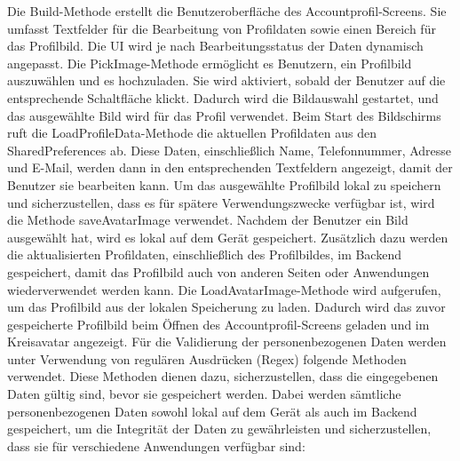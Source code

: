 Die Build-Methode erstellt die Benutzeroberfläche des Accountprofil-Screens. Sie umfasst Textfelder für die Bearbeitung von Profildaten sowie einen Bereich für das Profilbild. 
Die UI wird je nach Bearbeitungsstatus der Daten dynamisch angepasst. Die PickImage-Methode ermöglicht es Benutzern, ein Profilbild auszuwählen und es hochzuladen. Sie wird aktiviert, sobald der Benutzer auf die entsprechende Schaltfläche klickt.
Dadurch wird die Bildauswahl gestartet, und das ausgewählte Bild wird für das Profil verwendet. Beim Start des Bildschirms ruft die LoadProfileData-Methode die aktuellen Profildaten aus den SharedPreferences ab. 
Diese Daten, einschließlich Name, Telefonnummer, Adresse und E-Mail, werden dann in den entsprechenden Textfeldern angezeigt, damit der Benutzer sie bearbeiten kann. Um das ausgewählte Profilbild lokal zu speichern und sicherzustellen, dass es für spätere Verwendungszwecke verfügbar ist, wird die Methode saveAvatarImage verwendet.
Nachdem der Benutzer ein Bild ausgewählt hat, wird es lokal auf dem Gerät gespeichert. Zusätzlich dazu werden die aktualisierten Profildaten, einschließlich des Profilbildes, im Backend gespeichert, damit das Profilbild auch von anderen Seiten oder Anwendungen wiederverwendet werden kann. 
Die LoadAvatarImage-Methode wird aufgerufen, um das Profilbild aus der lokalen Speicherung zu laden. Dadurch wird das zuvor gespeicherte Profilbild beim Öffnen des Accountprofil-Screens geladen und im Kreisavatar angezeigt. 
Für die Validierung der personenbezogenen Daten werden unter Verwendung von regulären Ausdrücken (Regex) folgende Methoden verwendet. Diese Methoden dienen dazu, sicherzustellen, dass die eingegebenen Daten gültig sind, bevor sie gespeichert werden. Dabei werden sämtliche personenbezogenen Daten sowohl lokal auf dem Gerät als auch im Backend gespeichert, um die Integrität der Daten zu gewährleisten und sicherzustellen, dass sie für verschiedene Anwendungen verfügbar sind: 

